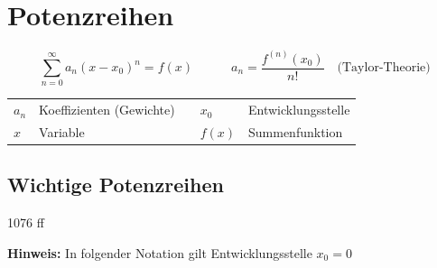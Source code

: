 \section{Potenzreihen}

\vspace{-0.2cm}

$$ \sum\limits _{n=0}^\infty a_n (x - x_0)^n = f(x) \qquad \quad a_n = \frac{f^{(n)}(x_0)}{n!} \quad \text{(Taylor-Theorie)} $$

\begin{tabular}{lllll}
    $a_n$   & Koeffizienten (Gewichte)  & & $x_0$   & Entwicklungsstelle \\
    $x$     & Variable                  & & $f(x)$  & Summenfunktion 
\end{tabular}


\subsection{Wichtige Potenzreihen}{1076 ff}

\textbf{Hinweis:} In folgender Notation gilt Entwicklungsstelle $x_0 = 0$

